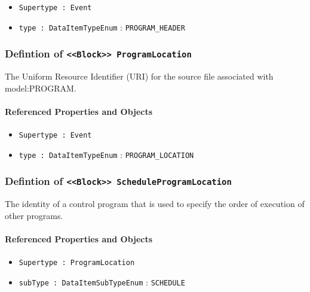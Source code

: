 \begin{itemize}
\item \texttt{Supertype : Event}

\item \texttt{type : DataItemTypeEnum} : \texttt{PROGRAM_HEADER}

\end{itemize}
\FloatBarrier
\subsubsection{Defintion of \texttt{<<Block>> ProgramLocation}}
  \label{type:ProgramLocation}

\FloatBarrier

The Uniform Resource Identifier (URI) for the source file associated with {model:PROGRAM}.

\FloatBarrier
\paragraph{Referenced Properties and Objects}

\begin{itemize}
\item \texttt{Supertype : Event}

\item \texttt{type : DataItemTypeEnum} : \texttt{PROGRAM_LOCATION}

\end{itemize}
\FloatBarrier
\subsubsection{Defintion of \texttt{<<Block>> ScheduleProgramLocation}}
  \label{type:ScheduleProgramLocation}

\FloatBarrier

The identity of a control program that is used to specify the order of execution of other programs.

\FloatBarrier
\paragraph{Referenced Properties and Objects}

\begin{itemize}
\item \texttt{Supertype : ProgramLocation}

\item \texttt{subType : DataItemSubTypeEnum} : \texttt{SCHEDULE}

\end{itemize}
\FloatBarrier
